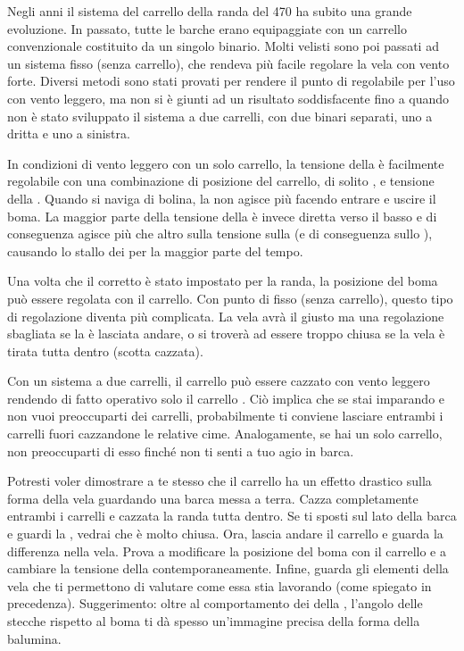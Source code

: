 Negli anni il sistema del carrello della randa del 470 ha subito una grande
evoluzione. In passato, tutte le barche erano equipaggiate con un carrello
convenzionale costituito da un singolo binario. Molti velisti sono poi passati
ad un sistema fisso (senza carrello), che rendeva più facile regolare la vela
con vento forte. Diversi metodi sono stati provati per rendere il punto di
\sheet regolabile per l'uso con vento leggero, ma non si è giunti ad un
risultato soddisfacente fino a quando non è stato sviluppato il sistema a due
carrelli, con due binari separati, uno a dritta e uno a sinistra.

In condizioni di vento leggero con un solo carrello, la tensione della \leech è
facilmente regolabile con una combinazione di posizione del carrello, di solito
\windward, e tensione della \sheet. Quando si naviga di bolina, la \sheet non
agisce più facendo entrare e uscire il boma. La maggior parte della tensione
della \sheet è invece diretta verso il basso e di conseguenza agisce più che
altro sulla tensione sulla \leech (e di conseguenza sullo \twist), causando lo
stallo dei \telltales per la maggior parte del tempo.

Una volta che il corretto \twist è stato impostato per la randa, la posizione
del boma può essere regolata con il carrello. Con punto di \sheet fisso (senza
carrello), questo tipo di regolazione diventa più complicata. La vela avrà il
giusto \twist ma una regolazione sbagliata se la \sheet è lasciata andare, o si
troverà ad essere troppo chiusa se la vela è tirata tutta dentro (scotta
cazzata).

Con un sistema a due carrelli, il carrello \leeward può essere cazzato con vento
leggero rendendo di fatto operativo solo il carrello \windward. Ciò implica che
se stai imparando e non vuoi preoccuparti dei carrelli, probabilmente ti
conviene lasciare entrambi i carrelli fuori cazzandone le relative cime.
Analogamente, se hai un solo carrello, non preoccuparti di esso finché non ti
senti a tuo agio in barca.

Potresti voler dimostrare a te stesso che il carrello \leeward ha un effetto
drastico sulla forma della vela guardando una barca messa a terra. Cazza
completamente entrambi i carrelli e cazzata la randa tutta dentro. Se ti sposti
sul lato \leeward della barca e guardi la \leech, vedrai che è molto chiusa.
Ora, lascia andare il carrello \leeward e guarda la differenza nella vela.
Prova a modificare la posizione del boma con il carrello \windward e a cambiare
la tensione della \sheet contemporaneamente. Infine, guarda gli elementi della
vela che ti permettono di valutare come essa stia lavorando (come spiegato in
precedenza). Suggerimento: oltre al comportamento dei \telltales della \leech,
l'angolo delle stecche rispetto al boma ti dà spesso un'immagine precisa della
forma della balumina.

